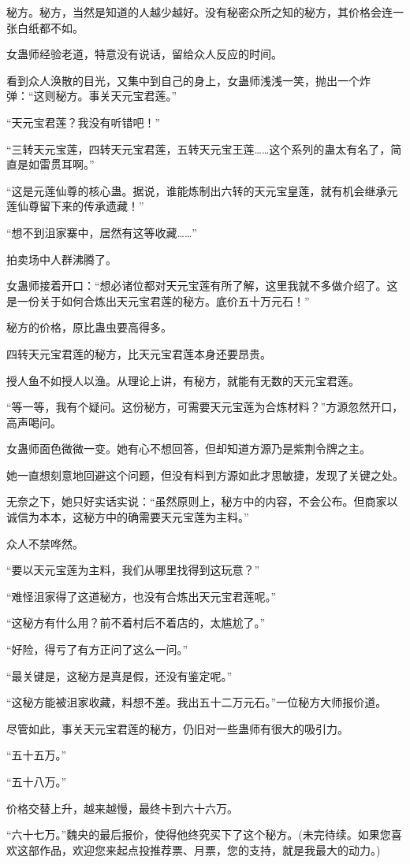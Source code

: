 \begin{this_body}
秘方。秘方，当然是知道的人越少越好。没有秘密众所之知的秘方，其价格会连一张白纸都不如。

女蛊师经验老道，特意没有说话，留给众人反应的时间。

看到众人涣散的目光，又集中到自己的身上，女蛊师浅浅一笑，抛出一个炸弹：“这则秘方。事关天元宝君莲。”

“天元宝君莲？我没有听错吧！”

“三转天元宝莲，四转天元宝君莲，五转天元宝王莲……这个系列的蛊太有名了，简直是如雷贯耳啊。”

“这是元莲仙尊的核心蛊。据说，谁能炼制出六转的天元宝皇莲，就有机会继承元莲仙尊留下来的传承遗藏！”

“想不到沮家寨中，居然有这等收藏……”

拍卖场中人群沸腾了。

女蛊师接着开口：“想必诸位都对天元宝莲有所了解，这里我就不多做介绍了。这是一份关于如何合炼出天元宝君莲的秘方。底价五十万元石！”

秘方的价格，原比蛊虫要高得多。

四转天元宝君莲的秘方，比天元宝君莲本身还要昂贵。

授人鱼不如授人以渔。从理论上讲，有秘方，就能有无数的天元宝君莲。

“等一等，我有个疑问。这份秘方，可需要天元宝莲为合炼材料？”方源忽然开口，高声喝问。

女蛊师面色微微一变。她有心不想回答，但却知道方源乃是紫荆令牌之主。

她一直想刻意地回避这个问题，但没有料到方源如此才思敏捷，发现了关键之处。

无奈之下，她只好实话实说：“虽然原则上，秘方中的内容，不会公布。但商家以诚信为本本，这秘方中的确需要天元宝莲为主料。”

众人不禁哗然。

“要以天元宝莲为主料，我们从哪里找得到这玩意？”

“难怪沮家得了这道秘方，也没有合炼出天元宝君莲呢。”

“这秘方有什么用？前不着村后不着店的，太尴尬了。”

“好险，得亏了有方正问了这么一问。”

“最关键是，这秘方是真是假，还没有鉴定呢。”

“这秘方能被沮家收藏，料想不差。我出五十二万元石。”一位秘方大师报价道。

尽管如此，事关天元宝君莲的秘方，仍旧对一些蛊师有很大的吸引力。

“五十五万。”

“五十八万。”

价格交替上升，越来越慢，最终卡到六十六万。

“六十七万。”魏央的最后报价，使得他终究买下了这个秘方。(未完待续。如果您喜欢这部作品，欢迎您来起点投推荐票、月票，您的支持，就是我最大的动力。)

\end{this_body}

